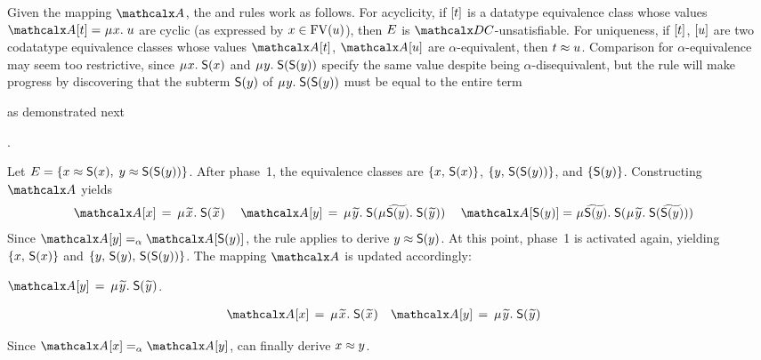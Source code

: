 Given the mapping $\Val$, the  and  rules work as follows.
For acyclicity, if $[t]$ is a datatype equivalence class
whose values $\Val \ec{t} = \MU x.\; u$ are cyclic
(as expressed by $x \in \mathrm{FV}( u )$),
then $E$ is $\thD$-unsatisfiable.
For uniqueness, if $[t]$, $[u]$ are two codatatype equivalence classes
whose values $\Val \ec{t}$, $\Val \ec{u}$ are $\alpha$-equivalent,
then $t \approx u$. Comparison for $\alpha$-equivalence may seem too restrictive, since
$\MU x.\; \const{S}(x)$ and $\MU y.\; \const{S}(\const{S}(y))$ specify the same
value despite being $\alpha$-disequivalent, but the rule will
make progress by discovering that the subterm $\textsf{S}(y)$ of $\MU y.\;
\const{S}(\const{S}(y))$ must be equal to the entire term\begin{rep}
as demonstrated next\end{rep}.


\begin{examplex}
Let $E = \{ x \approx \textsf{S}(x),\; y \approx \textsf{S}(\textsf{S}(y)) \}$.
After phase~1, the equivalence classes %
are
$\{ x,\, \textsf{S}(x) \}$,
$\{ y,\, \textsf{S}(\textsf{S}(y)) \}$,
and $\{ \textsf{S}(y) \}$.
Constructing $\Val$ yields
\begin{align*}
\Val \ec{x} & \,=\, \MU {\Varec{x}}.\; \const{S}(\Varec{x}) &
\kern0.25em %
\Val \ec{y} & \,=\,
\MU {\Varec{y}}.\; \const{S}(\smash{\MU {\VAREC{\const{S}(y)}}}.\; \const{S}( {\Varec{y}} ) )
\kern0.25em %
 &
\Val \ec{\const{S}(y)} & =
\MU {\VAREC{\const{S}(y)}}.\; \const{S}(\MU {\Varec{y}}.\; \const{S}( {\VAREC{\const{S}(y)}} ) )
\end{align*}
Since $\Val \ec{y} \aequiv \Val \ec{\const{S}(y)}$,
the  rule applies to derive $y \approx \textsf{S}(y)$.
%
At this point, phase~1 is activated again, %
yielding
$\{ x,\, \textsf{S}(x) \}$ and
$\{ y,\, \textsf{S}(y),\allowbreak\, \textsf{S}(\textsf{S}(y)) \}$.
The mapping $\Val$ is updated accordingly:
\begin{conf}%
$\Val \ec{y} \,=\, \MU {\Varec{y}}.\; \const{S}({\Varec{y}})$.
\end{conf}%
\begin{rep}
\begin{align*}
\Val \ec{x} & \,=\, \MU {\Varec{x}}.\; \const{S}(\Varec{x})
&
\Val \ec{y} & \,=\, \MU {\Varec{y}}.\; \const{S}({\Varec{y}})
\end{align*}
\end{rep}
Since $\Val \ec{x} \aequiv \Val \ec{y}$,
 can finally derive $x \approx y$.
\xend
\end{examplex}

